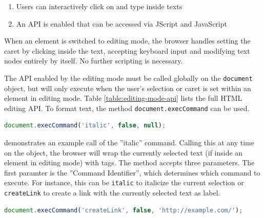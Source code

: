 \begin{enumerate} \item Users can interactively click on and type inside texts \item An API is enabled that can be accessed via JScript and JavaScript\end{enumerate}

When an element is switched to editing mode, the browser handles setting the caret by clicking inside the text, accepting keyboard input and modifying text nodes entirely by itself. No further scripting is necessary.

The API enabled by the editing mode must be called globally on the \texttt{document} object, but will only execute when the user's selection or caret is set within an element in editing mode. Table \ref{table:editing-mode-api} lists the full HTML editing API. To format text, the method \texttt{document.execCommand} can be used.

\begin{lstlisting}[language=JavaScript, caption=Emphasizing text using the HTML editing API, label=lst:execcommand-italics]
document.execCommand('italic', false, null);
\end{lstlisting}

 demonstrates an example call of the ''italic'' command. Calling this at any time on the  object, the browser will wrap the currently selected text (if inside an element in editing mode) with  tags. The method accepts three parameters. The first paramter is the ''Command Identifier'', which determines which command to execute. For instance, this can be \texttt{italic} to italicize the current selection or \texttt{createLink} to create a link with the currently selected text as label.

\begin{lstlisting}[language=JavaScript, caption=Creating a link using the HTML editing API, label=lst:execcommand-link]
document.execCommand('createLink', false, 'http://example.com/');
\end{lstlisting}


